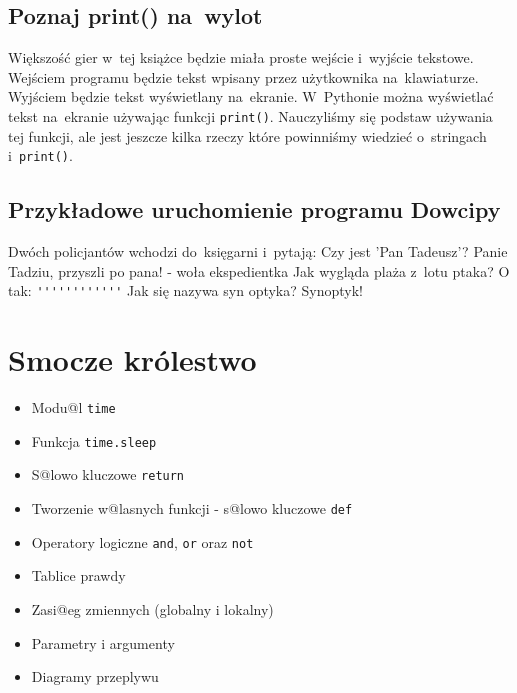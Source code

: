 \documentclass{book}
\newcommand{\btopicscovered}{
	\begin{graybox}
	\begin{itemize}
}
\newcommand{\etopicscovered}{
	\end{itemize}
	\end{graybox}
}
\begin{document}
\section{Poznaj print() na~wylot}

Większość gier w~tej książce będzie miała proste wejście i~wyjście tekstowe. Wejściem programu będzie tekst wpisany przez użytkownika na~klawiaturze. Wyjściem będzie tekst wyświetlany na~ekranie. W~Pythonie można wyświetlać tekst na~ekranie używając funkcji \lstinline{print()}. Nauczyliśmy się podstaw używania tej funkcji, ale jest jeszcze kilka rzeczy które powinniśmy wiedzieć o~stringach i~\lstinline{print()}.

\section{Przykładowe uruchomienie programu Dowcipy}

\begin{pseudolisting}
Dwóch policjantów wchodzi do~księgarni i~pytają:\linebreak
Czy jest 'Pan Tadeusz'?\linebreak
\linebreak
Panie Tadziu, przyszli po pana! - woła ekspedientka\linebreak
\linebreak
Jak wygląda plaża z~lotu ptaka?\linebreak
\linebreak
O tak: \lstinline{''''''''''''}\linebreak
\linebreak
Jak się nazywa syn optyka?\linebreak
\linebreak
Synoptyk!\linebreak
\end{pseudolisting}


\chapter{Smocze królestwo}
\btopicscovered
	\item Modu@l \lstinline{time}
	\item Funkcja \lstinline{time.sleep}
	\item S@lowo kluczowe \lstinline{return}
	\item Tworzenie w@lasnych funkcji - s@lowo kluczowe \lstinline{def}
	\item Operatory logiczne \lstinline{and}, \lstinline{or} oraz \lstinline{not}
	\item Tablice prawdy
	\item Zasi@eg zmiennych (globalny i lokalny)
	\item Parametry i argumenty
	\item Diagramy przeplywu %
\etopicscovered
\end{document}
